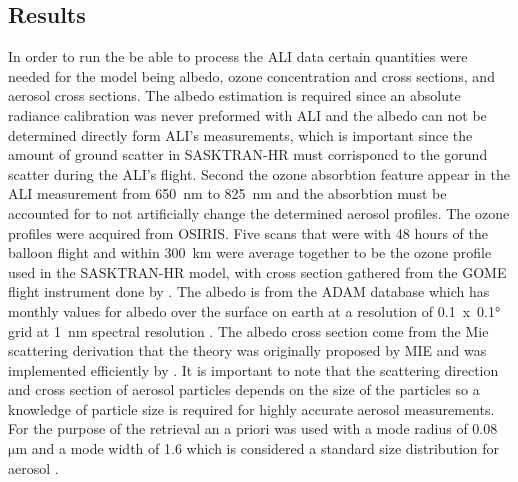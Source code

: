 \documentclass[12pt]{article}
\begin{document}
\subsection{Results}

In order to run the be able to process the ALI data certain quantities were needed for the model being albedo, ozone concentration and cross sections, and aerosol cross sections. The albedo estimation is required since an absolute radiance calibration was never preformed with ALI and the albedo can not be determined directly form ALI's measurements, which is important since the amount of ground scatter in SASKTRAN-HR must corrisponcd to the gorund scatter during the ALI's flight. Second the ozone absorbtion feature appear in the ALI measurement from 650~nm to 825~nm and the absorbtion must be accounted for to not artificially change the determined aerosol profiles. The ozone profiles were acquired from OSIRIS. Five scans that were with 48 hours of the balloon flight and  within 300~km were average together to be the ozone profile used in the SASKTRAN-HR model, with cross section gathered from the GOME flight instrument done by \cite{Burrows1999}. The albedo is from the ADAM database which has monthly values for albedo over the surface on earth at a resolution of 0.1~x~0.1\si{\degree} grid at 1~nm spectral resolution \citep{Muller2013}. The albedo cross section come from the Mie scattering derivation that the theory was originally proposed by MIE  and was implemented efficiently by \cite{Wiscombe1980}. It is important to note that the scattering direction and cross section of aerosol particles depends on the size of the particles so a knowledge of particle size is required for highly accurate aerosol measurements. For the purpose of the retrieval an a priori was used with a mode radius of 0.08~$\si{\micro\metre}$  and a mode width of 1.6 which is considered a standard size distribution for aerosol \citep{Deshler2003}.
\end{document}
